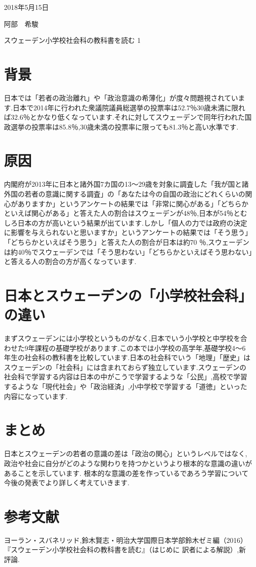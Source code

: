 \documentclass[a4j,11pt]{jsarticle}
\begin{document}
\begin{flushright} %
2018年5月15日

阿部　希駿
\end{flushright}

\begin{center}
\Large{スウェーデン小学校社会科の教科書を読む 1}
\end{center}

\section{背景}
\label{sec:mokuteki}
日本では「若者の政治離れ」や「政治意識の希薄化」が度々問題視されています.日本で2014年に行われた衆議院議員総選挙の投票率は52.7％30歳未満に限れば32.6％とかなり低くなっています.それに対してスウェーデンで同年行われた国政選挙の投票率は85.8％,30歳未満の投票率に限っても81.3％と高い水準です.

\section{原因}
内閣府が2013年に日本と諸外国7カ国の13〜29歳を対象に調査した「我が国と諸外国の若者の意識に関する調査」の「あなたは今の自国の政治にどれくらいの関心がありますか」というアンケートの結果では「非常に関心がある」「どちらかといえば関心がある」と答えた人の割合はスウェーデンが48％,日本が54％とむしろ日本の方が高いという結果が出ています.しかし「個人の力では政府の決定に影響を与えられないと思いますか」というアンケートの結果では「そう思う」「どちらかといえばそう思う」と答えた人の割合が日本は約70 ％,スウェーデンは約40％でスウェーデンでは「そう思わない」「どちらかといえばそう思わない」と答える人の割合の方が高くなっています.

\section{日本とスウェーデンの「小学校社会科」の違い}
まずスウェーデンには小学校というものがなく,日本でいう小学校と中学校を合わせた9年課程の基礎学校があります.この本では小学校の高学年,基礎学校4〜6年生の社会科の教科書を比較しています.日本の社会科でいう「地理」「歴史」はスウェーデンの「社会科」には含まれておらず独立しています.スウェーデンの社会科で学習する内容は日本の中がこうで学習するような「公民」,高校で学習するような「現代社会」や「政治経済」,小中学校で学習する「道徳」といった内容になっています.

\section{まとめ}
日本とスウェーデンの若者の意識の差は「政治の関心」というレベルではなく,政治や社会に自分がどのような関わりを持つかというより根本的な意識の違いがあることを示しています.
根本的な意識の差を作っているであろう学習について今後の発表でより詳しく考えていきます.

\section{参考文献}
ヨーラン・スバネリッド,鈴木賢志・明治大学国際日本学部鈴木ゼミ編（2016）『スウェーデン小学校社会科の教科書を読む』（はじめに 訳者による解説）,新評論.
  
\end{document}
